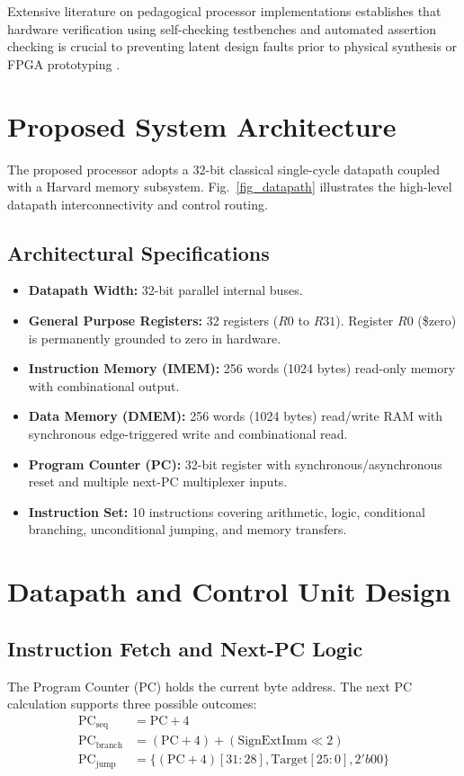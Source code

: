 \documentclass[conference]{IEEEtran}
\begin{document}
Extensive literature on pedagogical processor implementations establishes that hardware verification using self-checking testbenches and automated assertion checking is crucial to preventing latent design faults prior to physical synthesis or FPGA prototyping \cite{smith2018}.

\section{Proposed System Architecture}
The proposed processor adopts a 32-bit classical single-cycle datapath coupled with a Harvard memory subsystem. Fig.~\ref{fig_datapath} illustrates the high-level datapath interconnectivity and control routing.

\subsection{Architectural Specifications}
\begin{itemize}
    \item \textbf{Datapath Width:} 32-bit parallel internal buses.
    \item \textbf{General Purpose Registers:} 32 registers ($R0$ to $R31$). Register $R0$ (\$zero) is permanently grounded to zero in hardware.
    \item \textbf{Instruction Memory (IMEM):} 256 words (1024 bytes) read-only memory with combinational output.
    \item \textbf{Data Memory (DMEM):} 256 words (1024 bytes) read/write RAM with synchronous edge-triggered write and combinational read.
    \item \textbf{Program Counter (PC):} 32-bit register with synchronous/asynchronous reset and multiple next-PC multiplexer inputs.
    \item \textbf{Instruction Set:} 10 instructions covering arithmetic, logic, conditional branching, unconditional jumping, and memory transfers.
\end{itemize}

\section{Datapath and Control Unit Design}

\subsection{Instruction Fetch and Next-PC Logic}
The Program Counter (PC) holds the current byte address. The next PC calculation supports three possible outcomes:
\begin{align}
\text{PC}_{\text{seq}} &= \text{PC} + 4 \\
\text{PC}_{\text{branch}} &= (\text{PC} + 4) + (\text{SignExtImm} \ll 2) \\
\text{PC}_{\text{jump}} &= \{(\text{PC} + 4)[31:28], \text{Target}[25:0], 2'b00\}
\end{align}
\end{document}
